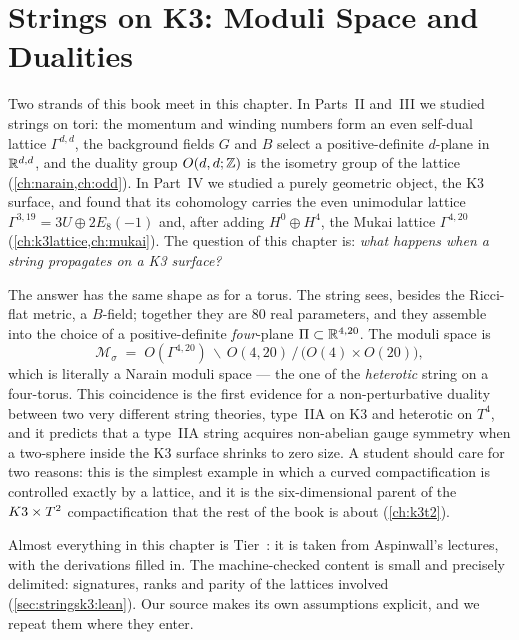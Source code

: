 \chapter{Strings on K3: Moduli Space and Dualities}\label{ch:stringsk3}

Two strands of this book meet in this chapter. In Parts~II and~III we studied strings on
tori: the momentum and winding numbers form an even self-dual lattice $\Gamma^{d,d}$, the
background fields $G$ and $B$ select a positive-definite $d$-plane in $\mathbb{R}^{d,d}$, and the
duality group $O(d,d;\mathbb{Z})$ is the isometry group of the lattice (\cref{ch:narain,ch:odd}). In
Part~IV we studied a purely geometric object, the K3 surface, and found that its cohomology
carries the even unimodular lattice $\Gamma^{3,19}=3U\oplus2E_8(-1)$ and, after adding
$H^0\oplus H^4$, the Mukai lattice $\Gamma^{4,20}$ (\cref{ch:k3lattice,ch:mukai}). The
question of this chapter is: \emph{what happens when a string propagates on a K3 surface?}

The answer has the same shape as for a torus. The string sees, besides the Ricci-flat
metric, a $B$-field; together they are $80$ real parameters, and they assemble into the
choice of a positive-definite \emph{four}-plane $\Pi\subset\mathbb{R}^{4,20}$. The moduli space is
\begin{equation}\label{eq:stringsk3:main}
  \mathcal M_\sigma \;=\; O(\Gamma^{4,20})\,\backslash\, O(4,20)\,/\,\big(O(4)\times O(20)\big),
\end{equation}
which is literally a Narain moduli space --- the one of the \emph{heterotic} string on a
four-torus. This coincidence is the first evidence for a non-perturbative duality between
two very different string theories, type~IIA on K3 and heterotic on $T^4$, and it predicts
that a type~IIA string acquires non-abelian gauge symmetry when a two-sphere inside the K3
surface shrinks to zero size. A student should care for two reasons: this is the simplest
example in which a curved compactification is controlled exactly by a lattice, and it is
the six-dimensional parent of the $K3\times T^2$ compactification that the rest of the book is about
(\cref{ch:k3t2}).

Almost everything in this chapter is Tier~\TL: it is taken from Aspinwall's lectures, with
the derivations filled in. The machine-checked content is small and precisely delimited:
signatures, ranks and parity of the lattices involved (\cref{sec:stringsk3:lean}). Our
source makes its own assumptions explicit, and we repeat them where they enter.

